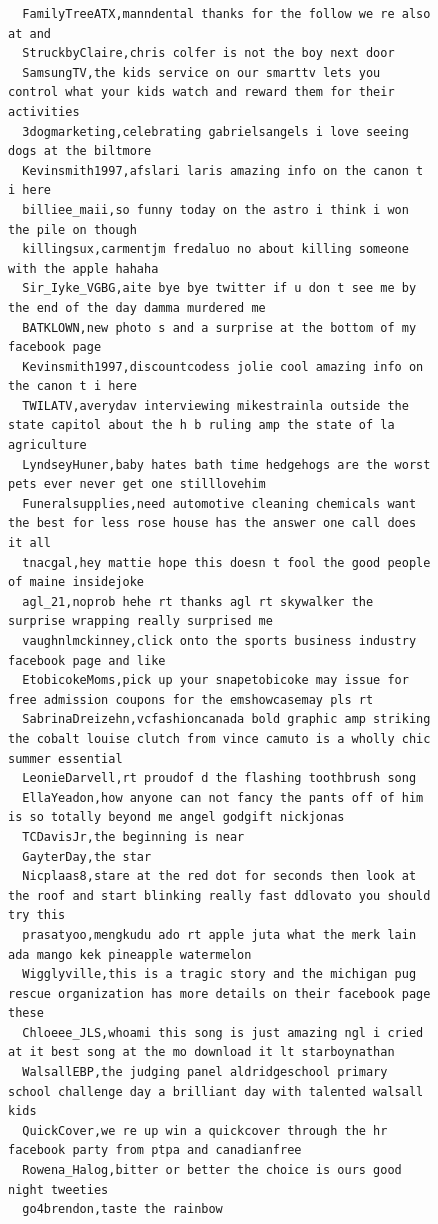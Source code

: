 \begin{figure}[htpb]
\begin{verbatim}
  FamilyTreeATX,manndental thanks for the follow we re also at and
  StruckbyClaire,chris colfer is not the boy next door
  SamsungTV,the kids service on our smarttv lets you control what your kids watch and reward them for their activities
  3dogmarketing,celebrating gabrielsangels i love seeing dogs at the biltmore
  Kevinsmith1997,afslari laris amazing info on the canon t i here
  billiee_maii,so funny today on the astro i think i won the pile on though
  killingsux,carmentjm fredaluo no about killing someone with the apple hahaha
  Sir_Iyke_VGBG,aite bye bye twitter if u don t see me by the end of the day damma murdered me
  BATKLOWN,new photo s and a surprise at the bottom of my facebook page
  Kevinsmith1997,discountcodess jolie cool amazing info on the canon t i here
  TWILATV,averydav interviewing mikestrainla outside the state capitol about the h b ruling amp the state of la agriculture
  LyndseyHuner,baby hates bath time hedgehogs are the worst pets ever never get one stilllovehim
  Funeralsupplies,need automotive cleaning chemicals want the best for less rose house has the answer one call does it all
  tnacgal,hey mattie hope this doesn t fool the good people of maine insidejoke
  agl_21,noprob hehe rt thanks agl rt skywalker the surprise wrapping really surprised me
  vaughnlmckinney,click onto the sports business industry facebook page and like
  EtobicokeMoms,pick up your snapetobicoke may issue for free admission coupons for the emshowcasemay pls rt
  SabrinaDreizehn,vcfashioncanada bold graphic amp striking the cobalt louise clutch from vince camuto is a wholly chic summer essential
  LeonieDarvell,rt proudof d the flashing toothbrush song
  EllaYeadon,how anyone can not fancy the pants off of him is so totally beyond me angel godgift nickjonas
  TCDavisJr,the beginning is near
  GayterDay,the star
  Nicplaas8,stare at the red dot for seconds then look at the roof and start blinking really fast ddlovato you should try this
  prasatyoo,mengkudu ado rt apple juta what the merk lain ada mango kek pineapple watermelon
  Wigglyville,this is a tragic story and the michigan pug rescue organization has more details on their facebook page these
  Chloeee_JLS,whoami this song is just amazing ngl i cried at it best song at the mo download it lt starboynathan
  WalsallEBP,the judging panel aldridgeschool primary school challenge day a brilliant day with talented walsall kids
  QuickCover,we re up win a quickcover through the hr facebook party from ptpa and canadianfree
  Rowena_Halog,bitter or better the choice is ours good night tweeties
  go4brendon,taste the rainbow

\end{verbatim}
\end{figure}

